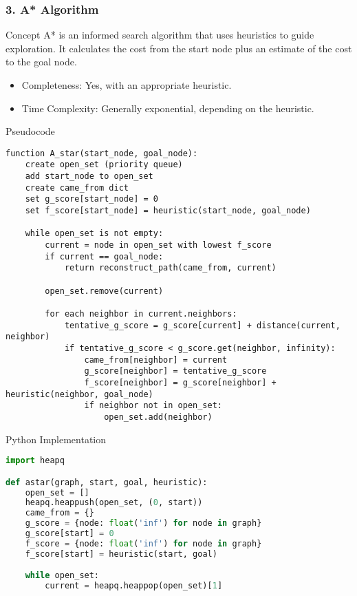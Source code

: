 \documentclass[aspectratio=169]{beamer}
\begin{document}
\begin{frame}[fragile]
    \frametitle{3. A* Algorithm}
    \begin{block}{Concept}
        A* is an informed search algorithm that uses heuristics to guide exploration. It calculates the cost from the start node plus an estimate of the cost to the goal node.
    \end{block}
    \begin{itemize}
        \item Completeness: Yes, with an appropriate heuristic.
        \item Time Complexity: Generally exponential, depending on the heuristic.
    \end{itemize}
    \begin{block}{Pseudocode}
    \begin{lstlisting}
function A_star(start_node, goal_node):
    create open_set (priority queue)
    add start_node to open_set
    create came_from dict
    set g_score[start_node] = 0
    set f_score[start_node] = heuristic(start_node, goal_node)
    
    while open_set is not empty:
        current = node in open_set with lowest f_score
        if current == goal_node:
            return reconstruct_path(came_from, current)
        
        open_set.remove(current)
        
        for each neighbor in current.neighbors:
            tentative_g_score = g_score[current] + distance(current, neighbor)
            if tentative_g_score < g_score.get(neighbor, infinity):
                came_from[neighbor] = current
                g_score[neighbor] = tentative_g_score
                f_score[neighbor] = g_score[neighbor] + heuristic(neighbor, goal_node)
                if neighbor not in open_set:
                    open_set.add(neighbor)
    \end{lstlisting}
    \end{block}
    \begin{block}{Python Implementation}
    \begin{lstlisting}[language=Python]
import heapq

def astar(graph, start, goal, heuristic):
    open_set = []
    heapq.heappush(open_set, (0, start))
    came_from = {}
    g_score = {node: float('inf') for node in graph}
    g_score[start] = 0
    f_score = {node: float('inf') for node in graph}
    f_score[start] = heuristic(start, goal)

    while open_set:
        current = heapq.heappop(open_set)[1]


\end{lstlisting}
\end{block}
\end{frame}
\end{document}
